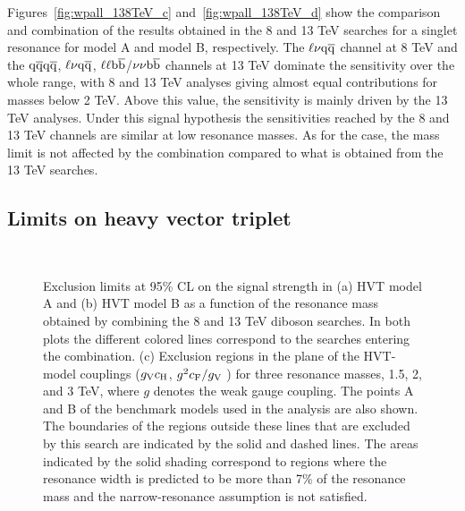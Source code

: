 Figures~\ref{fig:wpall_138TeV_c} and~\ref{fig:wpall_138TeV_d} show the comparison and combination of the results obtained in the 8 and 13 TeV searches for a \Zpr singlet resonance for model A and model B, respectively.
The $\ell \nu \mathrm{q}\overline{\mathrm{q}}$ channel at 8 TeV and the $\mathrm{q}\overline{\mathrm{q}} \mathrm{q}\overline{\mathrm{q}}$, $\ell \nu \mathrm{q}\overline{\mathrm{q}}$, $\ell\ell{\mathrm{b}\overline{\mathrm{b}}}$/$\nu\nu{\mathrm{b}\overline{\mathrm{b}}}$ channels at 13 TeV dominate the sensitivity over the whole range, with 8 and 13 TeV analyses giving almost equal contributions for masses below 2 TeV. Above this value, the sensitivity is mainly driven by the 13 TeV analyses.
Under this signal hypothesis the sensitivities reached by the 8 and 13 TeV channels are similar at low resonance masses. %
As for the \Wpr case, the mass limit is not affected by the combination compared to what is obtained from the 13 TeV searches.

\subsection{Limits on heavy vector triplet \PVpr}\label{subsec:comboHVT}

\begin{figure}[!htb]
\centering
{}
\\
\caption{
Exclusion limits at 95\% CL on the signal strength in (a) HVT model A and (b) HVT model B as a function of the resonance mass obtained by combining the 8 and 13 TeV diboson searches. In both plots the different colored lines correspond to the searches entering the combination.
(c) Exclusion regions in the plane of the HVT-model couplings ($g_{\rm V}c_{\rm H}$, $g^2c_{\rm F}/g_{\rm V}$ ) for three resonance masses, 1.5, 2, and 3 TeV, where $g$ denotes the weak gauge coupling. The points A and B of the benchmark models used in the analysis are also shown.
The boundaries of the regions outside these lines that are excluded by this search are indicated by the solid and dashed lines.
The areas indicated by the solid shading correspond to regions where the resonance width is predicted to be more than 7\% of the resonance mass and the narrow-resonance assumption is not satisfied.
}
\label{fig:hvtall_138TeV}
\end{figure}

